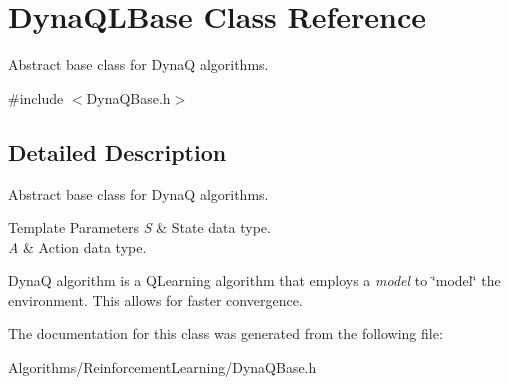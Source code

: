 \hypertarget{classDynaQLBase}{\section{Dyna\-Q\-L\-Base Class Reference}
\label{classDynaQLBase}
}


Abstract base class for Dyna\-Q algorithms.  




{\ttfamily \#include $<$Dyna\-Q\-Base.\-h$>$}



\subsection{Detailed Description}
Abstract base class for Dyna\-Q algorithms. 


\begin{DoxyTemplParams}{Template Parameters}
{\em S} & State data type. \\
\hline
{\em A} & Action data type.\\
\hline
\end{DoxyTemplParams}
Dyna\-Q algorithm is a Q\-Learning algorithm that employs a {\itshape model} to \char`\"{}model\char`\"{} the environment. This allows for faster convergence. 

The documentation for this class was generated from the following file\-:\begin{DoxyCompactItemize}
\item 
Algorithms/\-Reinforcement\-Learning/Dyna\-Q\-Base.\-h\end{DoxyCompactItemize}
